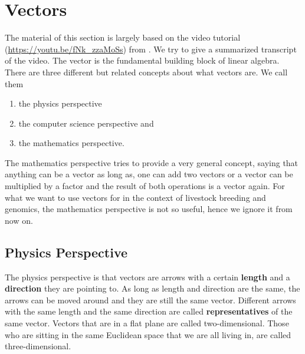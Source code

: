 \documentclass[
]{book}
\providecommand{\tightlist}{%
  \setlength{\itemsep}{0pt}\setlength{\parskip}{0pt}}
\theoremstyle{definition}
\theoremstyle{definition}
\theoremstyle{definition}
\theoremstyle{remark}
\begin{document}
\hypertarget{intro-linalg-vectors}{%
\section{Vectors}\label{intro-linalg-vectors}}

The material of this section is largely based on the video tutorial (\url{https://youtu.be/fNk_zzaMoSs}) from \citep{3Blue1Brown2016a}. We try to give a summarized transcript of the video. The vector is the fundamental building block of linear algebra. There are three different but related concepts about what vectors are. We call them

\begin{enumerate}
\def\labelenumi{\arabic{enumi}.}
\tightlist
\item
  the physics perspective
\item
  the computer science perspective and
\item
  the mathematics perspective.
\end{enumerate}

The mathematics perspective tries to provide a very general concept, saying that anything can be a vector as long as, one can add two vectors or a vector can be multiplied by a factor and the result of both operations is a vector again. For what we want to use vectors for in the context of livestock breeding and genomics, the mathematics perspective is not so useful, hence we ignore it from now on.

\hypertarget{intro-linalg-physics-perspective}{%
\subsection{Physics Perspective}\label{intro-linalg-physics-perspective}}

The physics perspective is that vectors are arrows with a certain \textbf{length} and a \textbf{direction} they are pointing to. As long as length and direction are the same, the arrows can be moved around and they are still the same vector. Different arrows with the same length and the same direction are called \textbf{representatives} of the same vector. Vectors that are in a flat plane are called two-dimensional. Those who are sitting in the same Euclidean space that we are all living in, are called three-dimensional.
\end{document}
